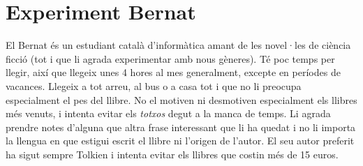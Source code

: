 
\section{Experiment Bernat}

El Bernat és un estudiant català d'informàtica amant de les novel·les de ciència ficció (tot i que li agrada experimentar amb nous gèneres). Té poc temps per llegir, així que llegeix unes 4 hores al mes generalment, excepte en períodes de vacances. Llegeix a tot arreu, al bus o a casa tot i que no li preocupa especialment el pes del llibre. No el motiven ni desmotiven especialment els llibres més venuts, i intenta evitar els \emph{totxos} degut a la manca de temps. Li agrada prendre notes d'alguna que altra frase interessant que li ha quedat i no li importa la llengua en que estigui escrit el llibre ni l'origen de l'autor. El seu autor preferit ha sigut sempre Tolkien i intenta evitar els llibres que costin més de 15 euros. 


